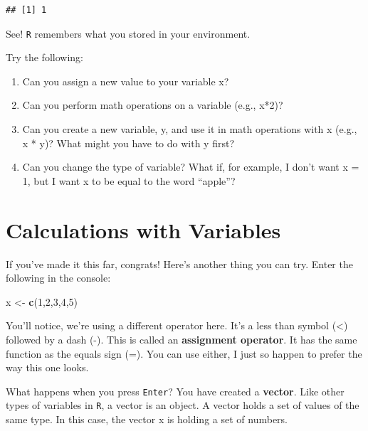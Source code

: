 \documentclass[
]{book}
\newenvironment{Shaded}{\begin{snugshade}}{\end{snugshade}}
\newcommand{\DecValTok}[1]{\textcolor[rgb]{0.00,0.00,0.81}{#1}}
\newcommand{\FunctionTok}[1]{\textcolor[rgb]{0.13,0.29,0.53}{\textbf{#1}}}
\newcommand{\NormalTok}[1]{#1}
\newcommand{\OtherTok}[1]{\textcolor[rgb]{0.56,0.35,0.01}{#1}}
\begin{document}
\begin{verbatim}
## [1] 1
\end{verbatim}

See! \texttt{R} remembers what you stored in your environment.

Try the following:

\begin{enumerate}
\def\labelenumi{\arabic{enumi}.}
\item
  Can you assign a new value to your variable x?
\item
  Can you perform math operations on a variable (e.g., x*2)?
\item
  Can you create a new variable, y, and use it in math operations with x (e.g., x * y)? What might you have to do with y first?
\item
  Can you change the type of variable? What if, for example, I don't want x = 1, but I want x to be equal to the word ``apple''?
\end{enumerate}

\hypertarget{calculations-with-variables}{%
\section{Calculations with Variables}\label{calculations-with-variables}}

If you've made it this far, congrats! Here's another thing you can try. Enter the following in the console:

\begin{Shaded}
\begin{Highlighting}[]
\NormalTok{x }\OtherTok{\textless{}{-}} \FunctionTok{c}\NormalTok{(}\DecValTok{1}\NormalTok{,}\DecValTok{2}\NormalTok{,}\DecValTok{3}\NormalTok{,}\DecValTok{4}\NormalTok{,}\DecValTok{5}\NormalTok{)}
\end{Highlighting}
\end{Shaded}

You'll notice, we're using a different operator here. It's a less than symbol (\textless) followed by a dash (-). This is called an \textbf{assignment operator}. It has the same function as the equals sign (=). You can use either, I just so happen to prefer the way this one looks.

What happens when you press \texttt{Enter}? You have created a \textbf{vector}. Like other types of variables in \texttt{R}, a vector is an object. A vector holds a set of values of the same type. In this case, the vector x is holding a set of numbers.
\end{document}
